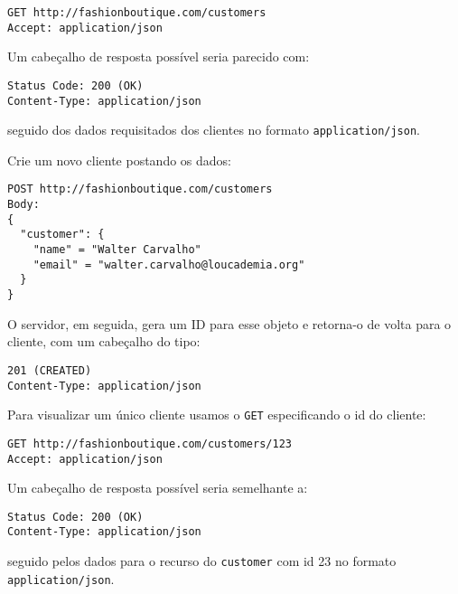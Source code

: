\documentclass[12pt, a4paper
]{article}
\begin{document}
\begin{verbatim}
GET http://fashionboutique.com/customers
Accept: application/json
\end{verbatim}

Um cabeçalho de resposta possível seria parecido com:

\begin{verbatim}
Status Code: 200 (OK)
Content-Type: application/json
\end{verbatim}

seguido dos dados requisitados dos clientes no formato
\texttt{application/json}.

Crie um novo cliente postando os dados:

\begin{verbatim}
POST http://fashionboutique.com/customers
Body:
{
  "customer": {
    "name" = "Walter Carvalho"
    "email" = "walter.carvalho@loucademia.org"
  }
}
\end{verbatim}

O servidor, em seguida, gera um ID para esse objeto e retorna-o de volta
para o cliente, com um cabeçalho do tipo:

\begin{verbatim}
201 (CREATED)
Content-Type: application/json
\end{verbatim}

Para visualizar um único cliente usamos o \texttt{GET} especificando o
id do cliente:

\begin{verbatim}
GET http://fashionboutique.com/customers/123
Accept: application/json
\end{verbatim}

Um cabeçalho de resposta possível seria semelhante a:

\begin{verbatim}
Status Code: 200 (OK)
Content-Type: application/json
\end{verbatim}

seguido pelos dados para o recurso do \texttt{customer} com id 23 no
formato \texttt{application/json}.
\end{document}
